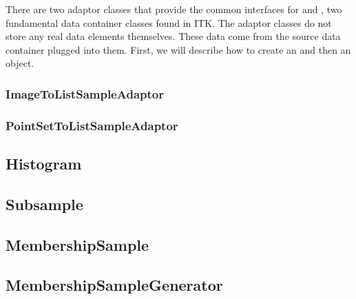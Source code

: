 There are two adaptor classes that provide the common
 interfaces for  and
, two fundamental data container classes found in ITK. The
adaptor classes do not store any real data elements themselves. These data
come from the source data container plugged into them. First, we will
describe how to create an
 and then an
 object.

\subsubsection{ImageToListSampleAdaptor}
\label{sec:ImageToListSampleAdaptor}

\ifitkFullVersion

\fi

\subsubsection{PointSetToListSampleAdaptor}
\label{sec:PointSetToListSampleAdaptor}

\ifitkFullVersion

\fi

\ifitkFullVersion

\fi


\subsection{Histogram}
\label{sec:Histogram}

\ifitkFullVersion

\fi

\subsection{Subsample}
\label{sec:Subsample}

\ifitkFullVersion

\fi

\subsection{MembershipSample}
\label{sec:MembershipSample}

\ifitkFullVersion

\fi

\subsection{MembershipSampleGenerator}
\label{sec:MembershipSampleGenerator}

